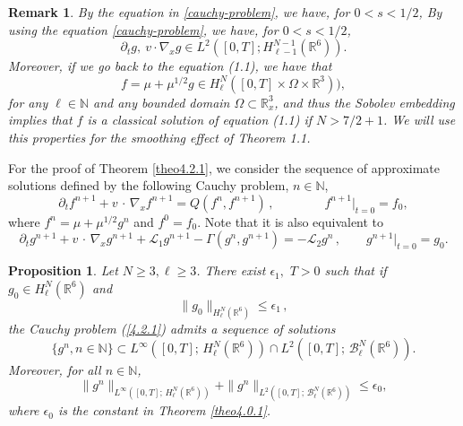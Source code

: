 \documentclass{amsart}[12pt, article]
\newtheorem{prop}[theo]{Proposition}
\newtheorem{rema}[theo]{Remark}
\begin{document}
\begin{rema}\label{rema4.4}
{}By the  equation in \eqref{cauchy-problem}, we have, for
 $0<s<1/2$,
By using the equation \eqref{cauchy-problem}, we have, for $0<s<1/2$,
\[
\partial_t g, \ v\cdot\nabla_x g \in L^2([0,T]; H^{N-1}_{\ell-1}({{{\mathbb R}}}^6)).
\]
Moreover, if we go back to the equation (1.1), we have that
\[
f=\mu+ \mu^{1/2}g\in H^N_\ell([0,T]\times\Omega\times {{{\mathbb R}}}^3)),
\]
for any $\ell\in {{\mathbb N}}$ and any bounded domain $\Omega\subset {{{\mathbb R}}}^3_x$, and
thus the Sobolev embedding implies
that $f$ is
a classical solution of equation (1.1) if $N>7/2+1$. We will use this properties for the
smoothing effect of Theorem 1.1.

\end{rema}

For the proof of Theorem \ref{theo4.2.1}, we consider the  sequence of approximate
solutions defined by the following Cauchy problem, $n\in{{\mathbb N}}$,
$$
\partial_t f^{n+1} + v\,\cdot\,\nabla_x f^{n+1} =Q (f^n, f^{n+1})
\,,\qquad\qquad f^{n+1}|_{t=0}=f_0,
$$
where $f^n = \mu + \mu^{1/2} g^n$ and $f^0=f_0$. Note that it is also equivalent to
\begin{equation}\label{4.2.1}
\partial_t g^{n+1} + v\,\cdot\,\nabla_x g^{n+1} + {{\mathcal L}}_1 g^{n+1}
- \Gamma (g^n , g^{n+1})=-{{\mathcal L}}_2 g^n\,,\qquad g^{n+1}|_{t=0}=g_0.
\end{equation}

\begin{prop}\label{prop4.2.1}
Let $N\geq 3, \ell\geq 3$. There exist $\epsilon_1,\,\,T>0$
such that if $g_0\in H^N_\ell({{{\mathbb R}}}^6)$ and
\begin{equation*}\label{4.2.2}
\|g_0\|_{H^N_\ell({{{\mathbb R}}}^6)}\leq \epsilon_1\, ,
\end{equation*}
the Cauchy problem (\ref{4.2.1}) admits a sequence of solutions
$$
\{g^n, n\in{{\mathbb N}}\}\subset L^\infty([0, T];\, H^N_\ell({{{\mathbb R}}}^6))\cap
L^2([0, T];\, {{\mathcal B}}^N_\ell({{{\mathbb R}}}^6)).
$$
Moreover, for all $n\in{{\mathbb N}}$,
\begin{equation}\label{4.2.3}
\|g^n\|_{L^\infty([0, T];\, H^N_\ell({{{\mathbb R}}}^6))}+\|g^n\|_{L^2([0, T];\,
{{\mathcal B}}^N_\ell({{{\mathbb R}}}^6))}\leq \epsilon_0,
\end{equation}
where $\epsilon_0$ is the constant in
Theorem \ref{theo4.0.1}.
\end{prop}
\end{document}

